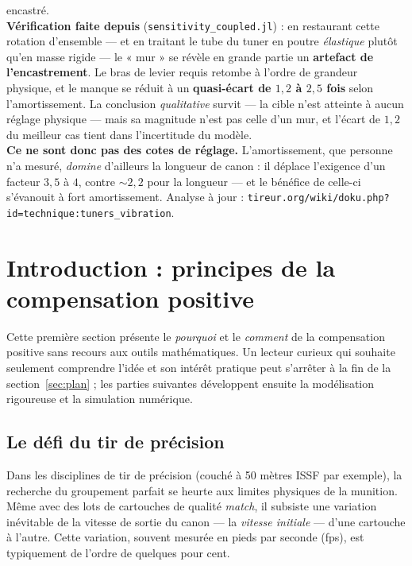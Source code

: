 \documentclass[12pt,a4paper]{article}
\begin{document}
\begin{center}
{{	encastré.\\[3pt]
	\textbf{Vérification faite depuis} (\texttt{sensitivity\_coupled.jl}) : en
	restaurant cette rotation d'ensemble --- et en traitant le tube du tuner en
	poutre \emph{élastique} plutôt qu'en masse rigide --- le « mur » se révèle en
	grande partie un \textbf{artefact de l'encastrement}. Le bras de levier requis
	retombe à l'ordre de grandeur physique, et le manque se réduit à un
	\textbf{quasi-écart de $1{,}2$ à $2{,}5$ fois} selon l'amortissement. La
	conclusion \emph{qualitative} survit --- la cible n'est atteinte à aucun réglage
	physique --- mais sa magnitude n'est pas celle d'un mur, et l'écart de $1{,}2$
	du meilleur cas tient dans l'incertitude du modèle.\\[3pt]
	\textbf{Ce ne sont donc pas des cotes de réglage.} L'amortissement, que
	personne n'a mesuré, \emph{domine} d'ailleurs la longueur de canon : il déplace
	l'exigence d'un facteur $3{,}5$ à $4$, contre $\sim 2{,}2$ pour la longueur ---
	et le bénéfice de celle-ci s'évanouit à fort amortissement. Analyse à jour :
	\texttt{tireur.org/wiki/doku.php?id=technique:tuners\_vibration}.}}
	\end{center}
	\vspace{1em}

	\tableofcontents
	\vspace{1cm}

	\section{Introduction : principes de la compensation positive}
	\label{sec:intro}

	Cette première section présente le \emph{pourquoi} et le \emph{comment} de la compensation positive sans recours aux outils mathématiques. Un lecteur curieux qui souhaite seulement comprendre l'idée et son intérêt pratique peut s'arrêter à la fin de la section~\ref{sec:plan} ; les parties suivantes développent ensuite la modélisation rigoureuse et la simulation numérique.

	\subsection{Le défi du tir de précision}

	Dans les disciplines de tir de précision (couché à 50 mètres ISSF par exemple), la recherche du groupement parfait se heurte aux limites physiques de la munition. Même avec des lots de cartouches de qualité \emph{match}, il subsiste une variation inévitable de la vitesse de sortie du canon — la \emph{vitesse initiale} — d'une cartouche à l'autre. Cette variation, souvent mesurée en pieds par seconde (fps), est typiquement de l'ordre de quelques pour cent.
\end{document}
